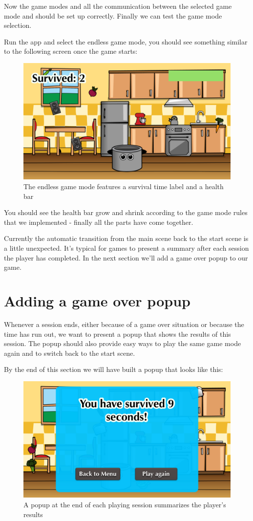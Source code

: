 Now the game modes and all the communication between the selected game mode and
 should be set up correctly. Finally we can test the game
mode selection. 

Run the app and select the endless game mode, you should see something
similar to the following screen once the game starts:

\begin{figure}[H]
    \centering
    \includegraphics[width=0.5\linewidth]{images/Chapter7/endless_game_with_ui.png}
    \caption{The endless game mode features a survival time label and a health
    bar}
\end{figure}

You should see the health bar grow and shrink according to the game mode
rules that we implemented - finally all the parts have come together.

Currently the automatic transition from the main scene back to the start scene
is a little unexpected. It's typical for games to present a summary after each
session the player has completed. In the next section we'll add a game over
popup to our game.

\section{Adding a game over popup}
Whenever a session ends, either because of a game over situation or because the
time has run out, we want to present a popup that shows the results of this
session. The popup should also provide easy ways to play the same game mode
again and to switch back to the start scene.

By the end of this section we will have built a popup that looks like this:
\begin{figure}[H]
    \centering
    \includegraphics[width=0.5\linewidth]{images/Chapter7/game_over_popup.png}
    \caption{A popup at the end of each playing session summarizes the player's
    results}\label{fig: gameover_popup}
\end{figure}

